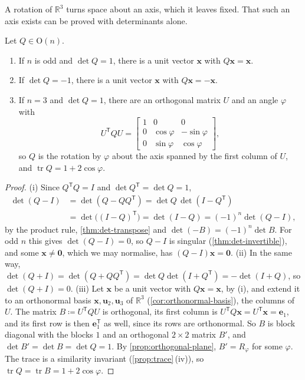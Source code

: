 A rotation of $\mathbb R^3$ turns space about an axis, which it leaves fixed. That such an axis exists can be proved with determinants alone.

\begin{proposition}
\label{prop:rotation-axis}
Let $Q\in\mathrm O(n)$.
\begin{enumerate}
\item If $n$ is odd and $\det Q=1$, there is a unit vector $\mathbf x$ with $Q\mathbf x=\mathbf x$.
\item If $\det Q=-1$, there is a unit vector $\mathbf x$ with $Q\mathbf x=-\mathbf x$.
\item If $n=3$ and $\det Q=1$, there are an orthogonal matrix $U$ and an angle $\varphi$ with
\[
U^{\mathsf T}QU=\begin{bmatrix}1&0&0\\0&\cos\varphi&-\sin\varphi\\0&\sin\varphi&\cos\varphi\end{bmatrix},
\]
so $Q$ is the rotation by $\varphi$ about the axis spanned by the first column of $U$, and $\operatorname{tr}Q=1+2\cos\varphi$.
\end{enumerate}
\end{proposition}

\begin{proof}
(i) Since $Q^{\mathsf T}Q=I$ and $\det Q^{\mathsf T}=\det Q=1$,
\[
\begin{aligned}
\det(Q-I)&=\det(Q-QQ^{\mathsf T})=\det Q\,\det(I-Q^{\mathsf T})\\
&=\det\bigl((I-Q)^{\mathsf T}\bigr)=\det(I-Q)=(-1)^n\det(Q-I),
\end{aligned}
\]
by the product rule, \cref{thm:det-transpose} and $\det(-B)=(-1)^n\det B$. For odd $n$ this gives $\det(Q-I)=0$, so $Q-I$ is singular (\cref{thm:det-invertible}), and some $\mathbf x\ne\mathbf 0$, which we may normalise, has $(Q-I)\mathbf x=\mathbf 0$. (ii) In the same way, $\det(Q+I)=\det(Q+QQ^{\mathsf T})=\det Q\det(I+Q^{\mathsf T})=-\det(I+Q)$, so $\det(Q+I)=0$. (iii) Let $\mathbf x$ be a unit vector with $Q\mathbf x=\mathbf x$, by (i), and extend it to an orthonormal basis $\mathbf x,\mathbf u_2,\mathbf u_3$ of $\mathbb R^3$ (\cref{cor:orthonormal-basis}), the columns of $U$. The matrix $B\coloneqq U^{\mathsf T}QU$ is orthogonal, its first column is $U^{\mathsf T}Q\mathbf x=U^{\mathsf T}\mathbf x=\mathbf e_1$, and its first row is then $\mathbf e_1^{\mathsf T}$ as well, since its rows are orthonormal. So $B$ is block diagonal with the blocks $1$ and an orthogonal $2\times2$ matrix $B'$, and $\det B'=\det B=\det Q=1$. By \cref{prop:orthogonal-plane}, $B'=R_\varphi$ for some $\varphi$. The trace is a similarity invariant (\cref{prop:trace}\,(iv)), so $\operatorname{tr}Q=\operatorname{tr}B=1+2\cos\varphi$.
\end{proof}

